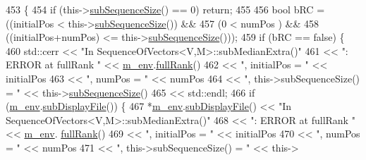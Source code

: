 \begin{DoxyCode}
453 \{
454   \textcolor{keywordflow}{if} (this->\hyperlink{class_q_u_e_s_o_1_1_sequence_of_vectors_a0224bd3e961d86af5d2886301c0c2b86}{subSequenceSize}() == 0) \textcolor{keywordflow}{return};
455 
456   \textcolor{keywordtype}{bool} bRC = ((initialPos          <  this->\hyperlink{class_q_u_e_s_o_1_1_sequence_of_vectors_a0224bd3e961d86af5d2886301c0c2b86}{subSequenceSize}()) &&
457               (0                   <  numPos                 ) &&
458               ((initialPos+numPos) <= this->\hyperlink{class_q_u_e_s_o_1_1_sequence_of_vectors_a0224bd3e961d86af5d2886301c0c2b86}{subSequenceSize}()));
459   \textcolor{keywordflow}{if} (bRC == \textcolor{keyword}{false}) \{
460     std::cerr << \textcolor{stringliteral}{"In SequenceOfVectors<V,M>::subMedianExtra()"}
461               << \textcolor{stringliteral}{": ERROR at fullRank "}         << \hyperlink{class_q_u_e_s_o_1_1_base_vector_sequence_a8e8824d2a63c5a43bcc6473e3a0491e8}{m\_env}.\hyperlink{class_q_u_e_s_o_1_1_base_environment_a84a239e42ae443cf71db6e03e8159620}{fullRank}()
462               << \textcolor{stringliteral}{", initialPos = "}              << initialPos
463               << \textcolor{stringliteral}{", numPos = "}                  << numPos
464               << \textcolor{stringliteral}{", this->subSequenceSize() = "} << this->\hyperlink{class_q_u_e_s_o_1_1_sequence_of_vectors_a0224bd3e961d86af5d2886301c0c2b86}{subSequenceSize}()
465               << std::endl;
466     \textcolor{keywordflow}{if} (\hyperlink{class_q_u_e_s_o_1_1_base_vector_sequence_a8e8824d2a63c5a43bcc6473e3a0491e8}{m\_env}.\hyperlink{class_q_u_e_s_o_1_1_base_environment_a8a0064746ae8dddfece4229b9ad374d6}{subDisplayFile}()) \{
467       *\hyperlink{class_q_u_e_s_o_1_1_base_vector_sequence_a8e8824d2a63c5a43bcc6473e3a0491e8}{m\_env}.\hyperlink{class_q_u_e_s_o_1_1_base_environment_a8a0064746ae8dddfece4229b9ad374d6}{subDisplayFile}() << \textcolor{stringliteral}{"In SequenceOfVectors<V,M>::subMedianExtra()"}
468                               << \textcolor{stringliteral}{": ERROR at fullRank "}         << \hyperlink{class_q_u_e_s_o_1_1_base_vector_sequence_a8e8824d2a63c5a43bcc6473e3a0491e8}{m\_env}.
      \hyperlink{class_q_u_e_s_o_1_1_base_environment_a84a239e42ae443cf71db6e03e8159620}{fullRank}()
469                               << \textcolor{stringliteral}{", initialPos = "}              << initialPos
470                               << \textcolor{stringliteral}{", numPos = "}                  << numPos
471                               << \textcolor{stringliteral}{", this->subSequenceSize() = "} << this->

\end{DoxyCode}
